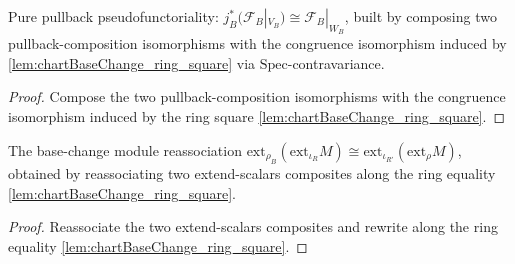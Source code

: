 \begin{lemma}
  \label{lem:chartBaseChangeGeometricComparison}
  Pure pullback pseudofunctoriality: \(j_B^{*}(\mathcal{F}_B|_{V_B})\cong\mathcal{F}_B|_{W_B}\), built
  by composing two pullback-composition isomorphisms with the congruence isomorphism induced by
  \cref{lem:chartBaseChange_ring_square} via \(\mathrm{Spec}\)-contravariance.
  \begin{proof}
    Compose the two pullback-composition isomorphisms with the congruence isomorphism induced by the
    ring square \cref{lem:chartBaseChange_ring_square}.
  \end{proof}
\end{lemma}

\begin{lemma}
  \label{lem:chartBaseChangeModuleReassoc}
  The base-change module reassociation
  \(\mathrm{ext}_{\rho_B}(\mathrm{ext}_{\iota_R}M)\cong\mathrm{ext}_{\iota_{R'}}(\mathrm{ext}_{\rho}M)\),
  obtained by reassociating two extend-scalars composites along the ring equality
  \cref{lem:chartBaseChange_ring_square}.
  \begin{proof}
    Reassociate the two extend-scalars composites and rewrite along the ring equality
    \cref{lem:chartBaseChange_ring_square}.
  \end{proof}
\end{lemma}

